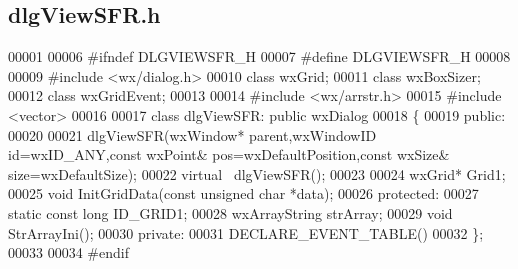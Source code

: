 \subsection{dlg\+View\+S\+F\+R.\+h}
\label{dlgViewSFR_8h_source}

\begin{DoxyCode}
00001 
00006 \textcolor{preprocessor}{#ifndef DLGVIEWSFR\_H}
00007 \textcolor{preprocessor}{#define DLGVIEWSFR\_H}
00008 
00009 \textcolor{preprocessor}{#include <wx/dialog.h>}
00010 \textcolor{keyword}{class }wxGrid;
00011 \textcolor{keyword}{class }wxBoxSizer;
00012 \textcolor{keyword}{class }wxGridEvent;
00013 
00014 \textcolor{preprocessor}{#include <wx/arrstr.h>}
00015 \textcolor{preprocessor}{#include <vector>}
00016 
00017 \textcolor{keyword}{class }dlgViewSFR: \textcolor{keyword}{public} wxDialog
00018 \{
00019     \textcolor{keyword}{public}:
00020 
00021         dlgViewSFR(wxWindow* parent,wxWindowID \textcolor{keywordtype}{id}=wxID\_ANY,\textcolor{keyword}{const} wxPoint& pos=wxDefaultPosition,\textcolor{keyword}{const} 
      wxSize& size=wxDefaultSize);
00022         \textcolor{keyword}{virtual} ~dlgViewSFR();
00023 
00024         wxGrid* Grid1;
00025         \textcolor{keywordtype}{void} InitGridData(\textcolor{keyword}{const} \textcolor{keywordtype}{unsigned} \textcolor{keywordtype}{char} *data);
00026     \textcolor{keyword}{protected}:
00027         \textcolor{keyword}{static} \textcolor{keyword}{const} \textcolor{keywordtype}{long} ID_GRID1;
00028         wxArrayString strArray;
00029         \textcolor{keywordtype}{void} StrArrayIni();
00030     \textcolor{keyword}{private}:
00031         DECLARE\_EVENT\_TABLE()
00032 \};
00033 
00034 \textcolor{preprocessor}{#endif}
\end{DoxyCode}
